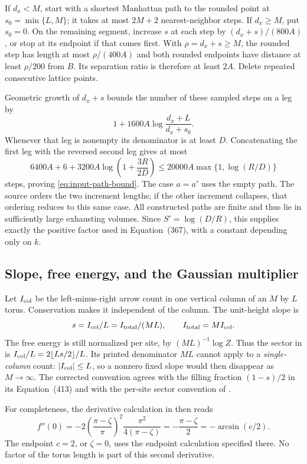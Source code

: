 If $d_x<M$, start with a shortest Manhattan path to the rounded point
at $s_0=\min\{L,M\}$; it takes at most $2M+2$ nearest-neighbor
steps. If $d_x\ge M$, put $s_0=0$. On the remaining segment, increase
$s$ at each step by $(d_x+s)/(800A)$, or stop at its endpoint if that
comes first. With $\rho=d_x+s\ge M$, the rounded step has length
at most $\rho/(400A)$ and both rounded endpoints have distance at
least $\rho/200$ from $B$. Its separation ratio is therefore at least
$2A$. Delete repeated consecutive lattice points.

Geometric growth of $d_x+s$ bounds the number of these sampled steps
on a leg by
\[
 1+1600A\log\frac{d_x+L}{d_x+s_0}.
\]
Whenever that leg is nonempty its denominator is at least $D$.
Concatenating the first leg with the reversed second leg gives at most
\[
 6400A+6+3200A\log\left(1+\frac{3R}{2D}\right)
 \le20000A\max\{1,\log(R/D)\}
\]
steps, proving \cref{eq:input-path-bound}. The case $a=a'$ uses the
empty path. The source orders the two increment lengths; if the other
increment collapses, that ordering reduces to this same case. All
constructed paths are finite and thus lie in sufficiently large
exhausting volumes. Since $S'=\log(D/R)$, this supplies exactly the
positive factor used in Equation~(367), with a constant depending
only on $k$.

\subsection{Slope, free energy, and the Gaussian multiplier}
\label{sec:input-amplitude}

Let $I_{\rm col}$ be the left-minus-right arrow count in one vertical
column of an $M$ by $L$ torus. Conservation makes it independent of
the column. The unit-height slope is
\[
 s=I_{\rm col}/L=I_{\rm total}/(ML),
 \qquad I_{\rm total}=M I_{\rm col}.
\]
The free energy is still normalized per site, by $(ML)^{-1}\log Z$.
Thus the sector in \cite[Definition~4.2]{DKLM2026} is
$I_{\rm col}/L=2\lfloor Ls/2\rfloor/L$. Its printed denominator
$ML$ cannot apply to a \emph{single-column} count: $|I_{\rm col}|\le L$,
so a nonzero fixed slope would then disappear as $M\to\infty$.
The corrected convention agrees with the filling fraction
$(1-s)/2$ in its Equation~(413) and with the per-site sector convention
of \cite[Section~1.2 and Theorem~2]{SixVertexFreeEnergy2022}.

For completeness, the derivative calculation in
\cite[Equations~(412) and~(416)]{DKLM2026} then reads
\[
 f''(0)=-2\left(\frac{\pi-\zeta}{\pi}\right)^2
             \frac{\pi^2}{4(\pi-\zeta)}
       =-\frac{\pi-\zeta}{2}=-\arcsin(c/2).
\]
The endpoint $c=2$, or $\zeta=0$, uses the endpoint calculation
specified there. No factor of the torus length is part of this
second derivative.

